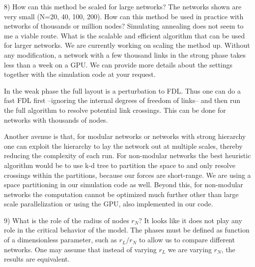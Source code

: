 \documentclass[11pt]{article}
\begin{document}
\begin{response}{
8) How can this method be scaled for large networks? The networks shown are very small (N=20, 40, 100, 200). How can this method be used in practice with networks of thousands or million nodes? Simulating annealing does not seem to me a viable route. What is the scalable and efficient algorithm that can be used for larger networks. 
}
We are currently working on scaling the method up. 
Without any modification, a network with a few thousand links in the strong phase takes less than a week on a GPU. 
We can provide more details about the settings together with the simulation code at your request. 

In the weak phase the full layout is a perturbation to FDL. 
Thus one can do a fast FDL first --ignoring the internal degrees of freedom of links-- and then run the full algorithm to resolve potential link crossings. 
This can be done for networks with thousands of nodes. 

Another avenue is that, for modular networks or networks with strong hierarchy one can exploit the hierarchy to lay the network out at multiple scales, thereby reducing the complexity of each run. 
For non-modular networks the best heuristic algorithm would be to use k-d tree to partition the space to and only resolve crossings within the partitions, because our forces are short-range. 
We are using a space partitioning in our simulation code as well. 
Beyond this, for non-modular networks the computation cannot be optimized much further other than large scale parallelization or using the GPU, also implemented in our code.


\end{response}
\begin{response}{
9) What is the role of the radius of nodes $r_N$? It looks like it does not play any role in the critical behavior of the model. 
}
The phases must be defined as function of a dimensionless parameter, such as $r_L/r_N$ to allow us to compare different networks. 
One may assume that instead of varying $r_L$ we are varying $r_N$, the results are equivalent. 

\end{response}
\end{document}
